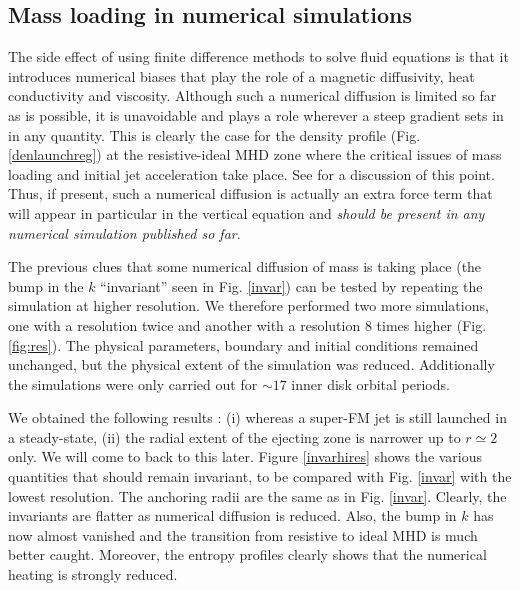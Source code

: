 \documentclass{aa}
\begin{document}
\subsection{Mass loading in numerical simulations}
\label{NumericalResolution}

The side effect of using finite difference methods to solve fluid equations is that it introduces numerical biases that play the role of a magnetic diffusivity, heat conductivity and
viscosity. Although such a numerical diffusion is limited so far as is possible, it is unavoidable and plays a role wherever a steep gradient sets in in any quantity. This is clearly the case for the
density profile (Fig. \ref{denlaunchreg}) at the resistive-ideal MHD zone where the critical issues of mass loading and initial jet acceleration take place. See \citet{2007A&A...469..811Z} for a
discussion of this point. Thus, if present, such a numerical diffusion is actually an extra force term that will appear in particular in the vertical equation and {\em should be present in any
numerical simulation published so far}.

The previous clues that some numerical diffusion of mass is taking place (the bump in the $k$ ``invariant'' seen in Fig. \ref{invar}) can be tested by repeating the simulation at higher resolution. We
therefore performed two more simulations, one with a resolution twice and another with a resolution 8 times higher (Fig. \ref{fig:res}). The physical parameters, boundary and initial conditions
remained unchanged, but the physical extent of the simulation was reduced. Additionally the simulations were only carried out for $\sim 17$ inner disk orbital periods.

We obtained the following results : (i) whereas a super-FM jet is still launched in a steady-state, (ii) the radial extent of the ejecting zone is narrower up to $r\simeq 2$ only. We will come to back
to this later. Figure \ref{invarhires} shows the various quantities that should remain invariant, to be compared with Fig. \ref{invar} with the lowest resolution. The anchoring radii are the same as
in Fig. \ref{invar}. Clearly, the invariants are flatter as numerical diffusion is reduced. Also, the bump in $k$ has now almost vanished and the transition from resistive to ideal MHD is much
better caught.  Moreover, the entropy profiles clearly shows that the numerical heating is strongly reduced.
\end{document}
